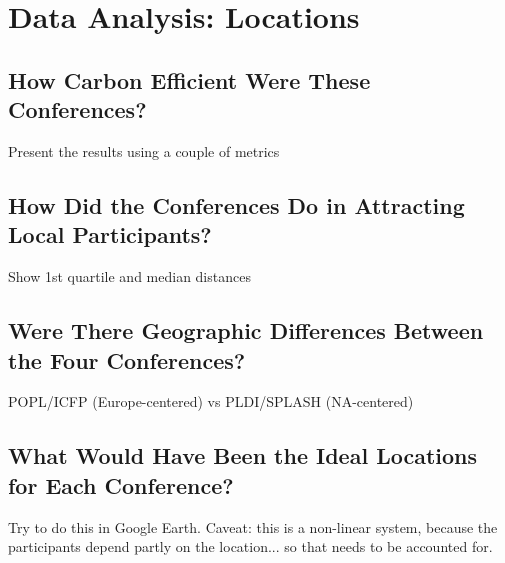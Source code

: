 \section{Data Analysis: Locations}

\subsection{How Carbon Efficient Were These Conferences?}

Present the results using a couple of metrics

\subsection{How Did the Conferences Do in Attracting Local Participants?}

Show 1st quartile and median distances

\subsection{Were There Geographic Differences Between the Four Conferences?}

POPL/ICFP (Europe-centered) vs PLDI/SPLASH (NA-centered)

\subsection{What Would Have Been the Ideal Locations for Each Conference?}

Try to do this in Google Earth. Caveat: this is a non-linear system, because the participants depend partly on the location... so that needs to be accounted for.
